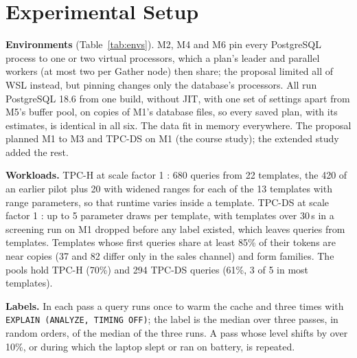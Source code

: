 \documentclass{article}
\newcommand{\inputif}[1]{\IfFileExists{#1}{}{}}
\begin{document}
\section{Experimental Setup}
\label{sec:experiments}
\textbf{Environments} (Table~\ref{tab:envs}). M2, M4 and M6 pin every PostgreSQL process to one or two virtual processors, which a plan's leader and parallel workers (at most two per Gather node) then share; the proposal limited all of WSL instead, but pinning changes only the database's processors. All run PostgreSQL 18.6 from one build, without JIT, with one set of settings apart from M5's buffer pool, on copies of M1's database files, so every saved plan, with its estimates, is identical in all six. The data fit in memory everywhere. The proposal planned M1 to M3 and TPC-DS on M1 (the course study); the extended study added the rest.

\begin{table}[t]
\caption{The six environments. Pass: minutes for one pass over a workload (median of three). Noise: Q-error between two passes over the same query, median / 90th percentile.}
\label{tab:envs}
\centering\small
\inputif{results/report/table_envs.tex}
\end{table}

\textbf{Workloads.} TPC-H at scale factor 1 \parencite{tpch}: 680 queries from 22 templates, the 420 of an earlier pilot plus 20 with widened ranges for each of the 13 templates with range parameters, so that runtime varies inside a template. TPC-DS at scale factor 1 \parencite{tpcds}: up to 5 parameter draws per template, with templates over 30\,s in a screening run on M1 dropped before any label existed, which leaves \DSScreenCollectFiles{} queries from \DSScreenKeptGroups{} templates. Templates whose first queries share at least 85\% of their tokens are near copies (37 and 82 differ only in the sales channel) and form \DSScreenKeptFamilies{} families. The pools hold \DataPool{} TPC-H (70\%) and 294 TPC-DS queries (61\%, 3 of 5 in most templates).

\textbf{Labels.} In each pass a query runs once to warm the cache and three times with \texttt{EXPLAIN (ANALYZE, TIMING OFF)}; the label is the median over three passes, in random orders, of the median of the three runs. A pass whose level shifts by over 10\%, or during which the laptop slept or ran on battery, is repeated.
\end{document}
